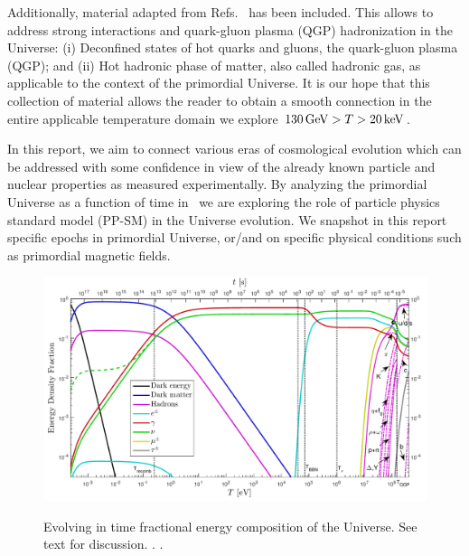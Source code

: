 Additionally, material adapted from Refs.~\cite{Letessier:2002ony,Rafelski:2015cxa,Rafelski:2016hnq,Rafelski:2019twp} has been included. This allows to address strong interactions and quark-gluon plasma (QGP) hadronization in the Universe: (i) Deconfined states of hot quarks and gluons, the quark-gluon plasma (QGP); and (ii) Hot hadronic phase of matter, also called hadronic gas, as applicable to the context of the primordial Universe. It is our hope that this collection of material allows the reader to obtain a smooth connection in the entire applicable temperature domain we explore $130\text{\,GeV}>T>20\,\mathrm{keV}$.

In this report, we aim to connect various eras of cosmological evolution which can be addressed with some confidence in view of the already known particle and nuclear properties as measured experimentally. By analyzing the primordial Universe as a function of time in~ we are exploring the role of particle physics standard model (PP-SM) in the Universe evolution. We snapshot in this report specific epochs in primordial Universe, or/and on specific physical conditions such as primordial magnetic fields.

\begin{figure}
\vspace*{0.62\linewidth}\includegraphics[width=\linewidth]{plots/energyFractions.pdf}\label{fig:energy:frac}
\caption{Evolving in time fractional energy composition of the Universe.  See text for discussion. . .}
 \end{figure}

